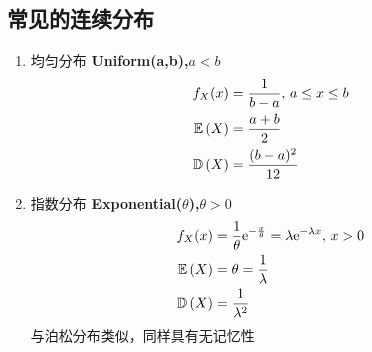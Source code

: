 \subsection{常见的连续分布}
\begin{enumerate}
	\item 均匀分布 \textbf{Uniform(a,b),$a<b$}
	\[\begin{aligned}
	f_X(x)&=\dfrac{1}{b-a},\,a\leq x\leq b\\
	\mathbb{E}\left(X\right)&=\dfrac{a+b}{2}\\
	\mathbb{D}\left(X\right)&=\dfrac{(b-a)^2}{12}
	\end{aligned}\]

	\item 指数分布 \textbf{Exponential($\theta$),$\theta>0$}
	\[\begin{aligned}
	f_X(x)&=\frac{1}{\theta}\mathrm{e}^{-\frac{x}{\theta}}=\lambda\mathrm{e}^{-\lambda x},\,x>0\\
	\mathbb{E}\left(X\right)&=\theta=\dfrac{1}{\lambda}\\
	\mathbb{D}\left(X\right)&=\frac{1}{\lambda^2}
	\end{aligned}\]
	与泊松分布类似，同样具有无记忆性


\end{enumerate}
